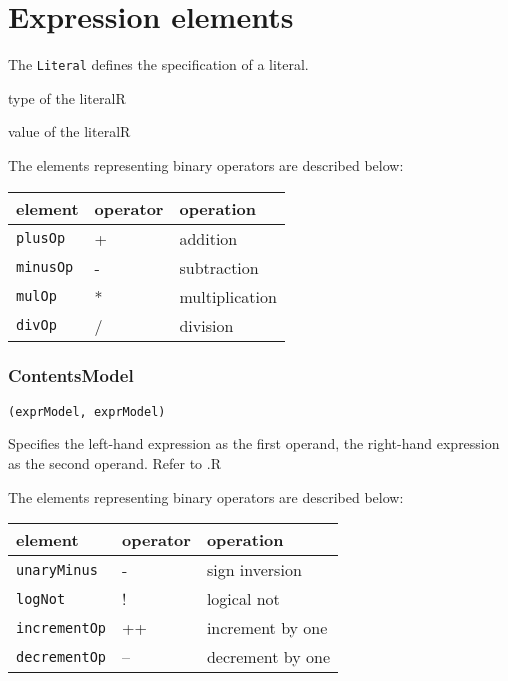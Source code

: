 \section{Expression elements}


The {\tt Literal} defines the specification of a literal.

\begin{HIRChildElements}
	{type of the literal}{R}
\end{HIRChildElements}

\begin{HIRAttributes}
	{value of the literal}{R}
\end{HIRAttributes}


The elements representing binary operators are described below: 

\begin{tabular}{|l|p{4cm}|l|}
	\hline
	 element & operator & operation \\ \hline\hline
	 {\tt plusOp} & + & addition \\ \hline 
	 {\tt minusOp} & - & subtraction \\ \hline 
	 {\tt mulOp} & * & multiplication \\ \hline 
	 {\tt divOp} & / & division \\ \hline 
\end{tabular}

\subsubsection*{ContentsModel}{}

\begin{lstlisting}[style=default,frame=none]
(exprModel, exprModel)
\end{lstlisting}


\begin{HIRChildElements}
	{Specifies the left-hand expression as the first operand, the right-hand 
	 expression as the second operand. Refer to .}{R}
\end{HIRChildElements}



The elements representing binary operators are described below: 

\begin{tabular}{|l|p{4cm}|l|}
	\hline
	 element & operator & operation \\ \hline\hline
	 {\tt unaryMinus} & - & sign inversion \\ \hline 
	 {\tt logNot} & ! & logical not \\ \hline 
	 {\tt incrementOp} & ++ & increment by one \\ \hline 
	 {\tt decrementOp} & -- & decrement by one \\ \hline 
\end{tabular}

